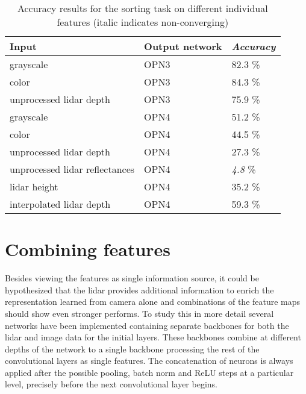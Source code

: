 
\begin{table}[]
\centering
\caption{Accuracy results for the sorting task on different individual features (italic indicates non-converging)}
\label{tab:indiv_results}
\begin{tabular}{|p{7.5cm}|p{2cm}|p{2cm}|}
\hline
\textbf{Input}                                                          & \textbf{Output network} & \textit{\textbf{Accuracy}} \\ \hline
grayscale                                                               & OPN3                    & 82.3 \%                   \\ \hline
color                                                                   & OPN3                    & 84.3 \%                   \\ \hline
unprocessed lidar depth                                                 & OPN3                    & 75.9 \%                   \\ \hline
grayscale                                                               & OPN4                    & 51.2 \%                   \\ \hline
color                                                                   & OPN4                    & 44.5 \%                   \\ \hline
unprocessed lidar depth                                                 & OPN4                    & 27.3 \%                   \\ \hline
unprocessed lidar reflectances                                          & OPN4                    & \textit{4.8} \%                   \\ \hline
lidar height                                                            & OPN4                    & 35.2 \%                   \\ \hline
interpolated lidar depth                                                & OPN4                    & 59.3 \%                   \\ \hline
\end{tabular}
\end{table}

\section{Combining features}
Besides viewing the features as single information source, it could be hypothesized that the lidar provides additional information to enrich the representation learned from camera alone and combinations of the feature maps should show even stronger performs. To study this in more detail several networks have been implemented containing separate backbones for both the lidar and image data for the initial layers. These backbones combine at different depths of the network to a single backbone processing the rest of the convolutional layers as single features. The concatenation of neurons is always applied after the possible pooling, batch norm and ReLU steps at a particular level, precisely before the next convolutional layer begins.

